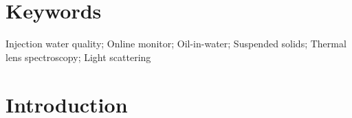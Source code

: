 \documentclass[10pt,authoryear,twocolumn]{article}
\begin{document}
\begin{abstract}

A novel system for continuous online monitoring of both oil-in-water and suspended solids based on thermal lens spectroscopy and forward scattering is presented. The technique measures the concentration of dissolved hydrocarbons and simultaneously detects single oil droplets and suspended particles separately. The device was tested with injection water from an on-field water treatment plant, through which hydrocarbon concentration were measured with a minimum resolution of \SI{0.02}{\ppm} and precision better than \SI{5}{\percent} in the range up to \SI{100}{\ppm}. Particle detection was tested on artificial samples of polystyrene spheres acting as absorption and scattering centers simulating oil droplets and suspended solids respectively. We show that their concentration can be determined in the range up to \SI{3000}{particles\per\milli\litre} while also distinguishing particles of different sizes.

\end{abstract}

\section*{Keywords}
Injection water quality; Online monitor; Oil-in-water; Suspended solids; Thermal lens spectroscopy; Light scattering





\section{Introduction}
\label{Introduction}
\end{document}
